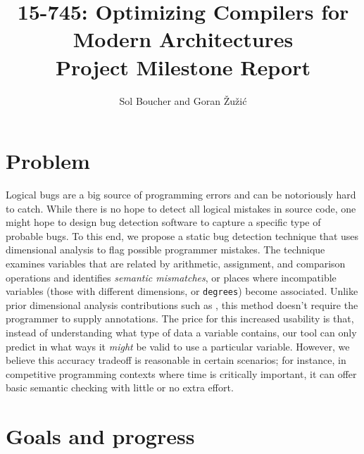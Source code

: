 \documentclass[12pt]{article}
\title{{\small 15-745: Optimizing Compilers for Modern Architectures} \\ Project Milestone Report}
\author{Sol Boucher and Goran \v{Z}u\v{z}i\'c}
\begin{document}
\maketitle

\section{Problem}

Logical bugs are a big source of programming errors and can be notoriously hard to catch.
While there is no hope to detect all logical mistakes in source code, one might hope to design bug detection software to capture a specific type of probable bugs.
To this end, we propose a static bug detection technique that uses dimensional analysis to flag possible programmer mistakes.
The technique examines variables that are related by arithmetic, assignment, and comparison operations and identifies \textit{semantic mismatches}, or places where incompatible variables (those with different dimensions, or \texttt{degrees}) become associated.
Unlike prior dimensional analysis contributions such as \cite{hilfinger1988ada}, this method doesn't require the programmer to supply annotations.
The price for this increased usability is that, instead of understanding what type of data a variable contains, our tool can only predict in what ways it \textit{might} be valid to use a particular variable.
However, we believe this accuracy tradeoff is reasonable in certain scenarios; for instance, in competitive programming contexts where time is critically important, it can offer basic semantic checking with little or no extra effort.


\section{Goals and progress}
\end{document}
